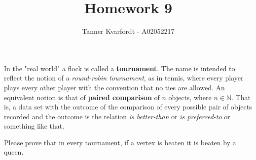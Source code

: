 \documentclass[12pt]{article}
\newenvironment{problem}[2][Problem]{\begin{trivlist}
\item[\hskip \labelsep {\bfseries #1}\hskip \labelsep {\bfseries #2.}]}{\end{trivlist}}
\begin{document}
 
 
\title{Homework 9}
\author{Tanner Kvarfordt - A02052217}
\maketitle
 
In the "real world" a flock is called a \textbf{tournament}. The name is intended to reflect the notion of a \textit{round-robin tournament}, as in tennis, where every player plays every other player with the convention that no ties are allowed. An equivalent notion is that of \textbf{paired comparison} of $n$ objects, where $n \in\mathbb{N}$. That is, a data set with the outcome of the comparison of every possible pair of objects recorded and the outcome is the relation \textit{is better-than} or \textit{is preferred-to} or something like that.
 
\begin{problem}{1}
Please prove that in every tournament, if a vertex is beaten it is beaten by a queen.
\end{problem}
 
\end{document}
